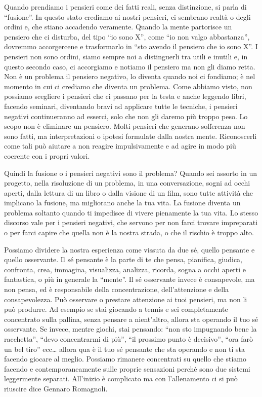 \documentclass[12pt]{book} %
\begin{document}
Quando prendiamo i pensieri come dei fatti reali, senza distinzione, si parla di “fusione”. In questo stato crediamo ai
nostri pensieri, ci sembrano realtà o degli ordini e, che stiano accadendo veramente. Quando la mente
partorisce un pensiero che ci disturba, del tipo “io sono X”, come “io non valgo abbastanza”, dovremmo accorgercene e
trasformarlo in “sto avendo il pensiero che io sono X”. I pensieri non sono ordini, siamo sempre noi a distinguerli tra
utili e inutili e, in questo secondo caso, ci accorgiamo e notiamo il pensiero ma non gli diamo retta. Non è un
problema il pensiero negativo, lo diventa quando noi ci fondiamo; è nel momento in cui ci crediamo che diventa un
problema. Come abbiamo visto, non possiamo scegliere i pensieri che ci passano per la testa e anche leggendo libri,
facendo seminari, diventando bravi ad applicare tutte le tecniche, i pensieri negativi continueranno ad esserci, solo
che non gli daremo più troppo peso. Lo scopo non è eliminare un pensiero. Molti pensieri che generano sofferenza non sono fatti, ma interpretazioni o ipotesi formulate dalla nostra mente. Riconoscerli come tali può aiutare a non reagire impulsivamente e ad agire in modo più coerente con i propri valori. 

Quindi la fusione o i pensieri negativi sono il problema? Quando sei assorto in un progetto, nella risoluzione di un
problema, in una conversazione, sogni ad occhi aperti, dalla lettura di un libro o dalla visione di un film, sono tutte
attività che implicano la fusione, ma migliorano anche la tua vita. La fusione diventa un problema soltanto quando ti
impedisce di vivere pienamente la tua vita. Lo stesso discorso vale per i pensieri negativi, che servono per non farci
trovare impreparati o per farci capire che quella non è la nostra strada, o che il rischio è troppo alto. 

Possiamo dividere la nostra esperienza come vissuta da due sé, quello pensante e quello osservante. Il sé pensante è la
parte di te che pensa, pianifica, giudica, confronta, crea, immagina, visualizza, analizza, ricorda, sogna a occhi
aperti e fantastica, o più in generale la “mente”. Il sé osservante invece è consapevole, ma non pensa, ed è
responsabile della concentrazione, dell'attenzione e della consapevolezza. Può osservare o
prestare attenzione ai tuoi pensieri, ma non li può produrre. Ad esempio se stai giocando a tennis e sei completamente
concentrato sulla pallina, senza pensare a nient'altro, allora sta operando il tuo sé osservante.
Se invece, mentre giochi, stai pensando: “non sto impugnando bene la racchetta”, “devo concentrarmi di più”, “il
prossimo punto è decisivo”, “ora farò un bel tiro” ecc… allora qua è il tuo sé pensante che sta operando e non ti sta
facendo giocare al meglio. Possiamo rimanere concentrati su quello che stiamo facendo e contemporaneamente sulle proprie sensazioni perché sono due sistemi leggermente separati. All'inizio è complicato ma con l'allenamento ci si può riuscire dice Gennaro Romagnoli.
\end{document}
